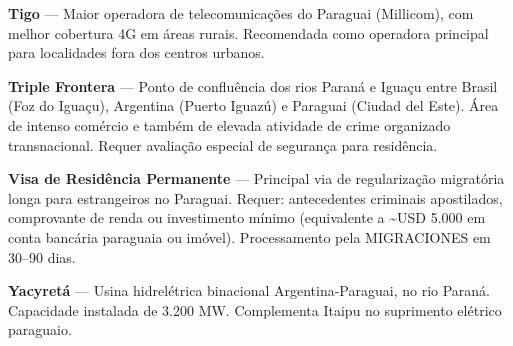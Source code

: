 \medskip
\noindent\textbf{Tigo} — Maior operadora de telecomunicações do Paraguai (Millicom), com melhor cobertura 4G em áreas rurais. Recomendada como operadora principal para localidades fora dos centros urbanos.

\medskip
\noindent\textbf{Triple Frontera} — Ponto de confluência dos rios Paraná e Iguaçu entre Brasil (Foz do Iguaçu), Argentina (Puerto Iguazú) e Paraguai (Ciudad del Este). Área de intenso comércio e também de elevada atividade de crime organizado transnacional. Requer avaliação especial de segurança para residência.

\medskip
\noindent\textbf{Visa de Residência Permanente} — Principal via de regularização migratória longa para estrangeiros no Paraguai. Requer: antecedentes criminais apostilados, comprovante de renda ou investimento mínimo (equivalente a \textasciitilde{}USD 5.000 em conta bancária paraguaia ou imóvel). Processamento pela MIGRACIONES em 30--90 dias.

\medskip
\noindent\textbf{Yacyretá} — Usina hidrelétrica binacional Argentina-Paraguai, no rio Paraná. Capacidade instalada de 3.200 MW. Complementa Itaipu no suprimento elétrico paraguaio.

